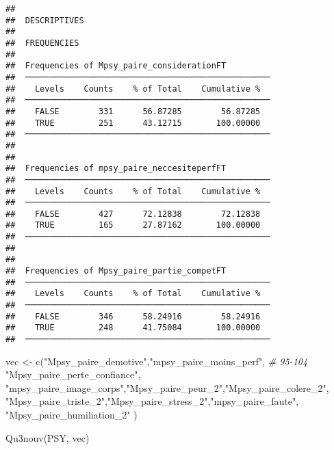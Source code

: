 \documentclass[
]{article}
\newenvironment{Shaded}{\begin{snugshade}}{\end{snugshade}}
\newcommand{\CommentTok}[1]{\textcolor[rgb]{0.56,0.35,0.01}{\textit{#1}}}
\newcommand{\FunctionTok}[1]{\textcolor[rgb]{0.00,0.00,0.00}{#1}}
\newcommand{\NormalTok}[1]{#1}
\newcommand{\OtherTok}[1]{\textcolor[rgb]{0.56,0.35,0.01}{#1}}
\newcommand{\StringTok}[1]{\textcolor[rgb]{0.31,0.60,0.02}{#1}}
\begin{document}
\begin{verbatim}
## 
##  DESCRIPTIVES
## 
##  FREQUENCIES
## 
##  Frequencies of Mpsy_paire_considerationFT          
##  ────────────────────────────────────────────────── 
##    Levels    Counts    % of Total    Cumulative %   
##  ────────────────────────────────────────────────── 
##    FALSE        331      56.87285        56.87285   
##    TRUE         251      43.12715       100.00000   
##  ────────────────────────────────────────────────── 
## 
## 
##  Frequencies of mpsy_paire_neccesiteperfFT          
##  ────────────────────────────────────────────────── 
##    Levels    Counts    % of Total    Cumulative %   
##  ────────────────────────────────────────────────── 
##    FALSE        427      72.12838        72.12838   
##    TRUE         165      27.87162       100.00000   
##  ────────────────────────────────────────────────── 
## 
## 
##  Frequencies of Mpsy_paire_partie_competFT          
##  ────────────────────────────────────────────────── 
##    Levels    Counts    % of Total    Cumulative %   
##  ────────────────────────────────────────────────── 
##    FALSE        346      58.24916        58.24916   
##    TRUE         248      41.75084       100.00000   
##  ──────────────────────────────────────────────────
\end{verbatim}

\begin{Shaded}
\begin{Highlighting}[]
\NormalTok{vec }\OtherTok{\textless{}{-}} \FunctionTok{c}\NormalTok{(}\StringTok{"Mpsy\_paire\_demotive"}\NormalTok{,}\StringTok{"mpsy\_paire\_moins\_perf"}\NormalTok{,  }\CommentTok{\# 95{-}104}
         \StringTok{"Mpsy\_paire\_perte\_confiance"}\NormalTok{,  }
    \StringTok{"mpsy\_paire\_image\_corps"}\NormalTok{,}\StringTok{"Mpsy\_paire\_peur\_2"}\NormalTok{,}\StringTok{"Mpsy\_paire\_colere\_2"}\NormalTok{,}
    \StringTok{"Mpsy\_paire\_triste\_2"}\NormalTok{,}\StringTok{"Mpsy\_paire\_stress\_2"}\NormalTok{,}\StringTok{"mpsy\_paire\_faute"}\NormalTok{,}
    \StringTok{"Mpsy\_paire\_humiliation\_2"}                                  
\NormalTok{     )}

\FunctionTok{Qu3nouv}\NormalTok{(PSY, vec)}
\end{Highlighting}
\end{Shaded}
\end{document}
